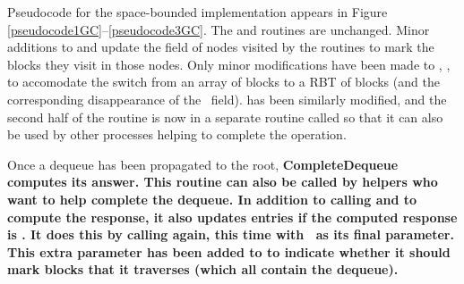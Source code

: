 
Pseudocode for the space-bounded implementation appears in Figure \ref{pseudocode1GC}--\ref{pseudocode3GC}.
The  and  routines are unchanged.
Minor additions to  and  update the  field of nodes
visited by the routines to mark the blocks they visit in those nodes.
Only minor modifications have been made to , , 
to accomodate the switch from an array of blocks to a RBT of blocks (and the corresponding disappearance
of the \head\ field).
 has been similarly modified, and the second half of the routine is now in a
separate routine called  so that it can also be used by other processes
helping to complete the operation.

Once a dequeue has been propagated to the root, 
\bf{\op CompleteDequeue} computes its answer.  This routine can also be called by helpers 
who want to help complete the dequeue.
In addition to calling  and  to compute the response,
it also updates  entries if the computed response is \nl.
It does this by calling  again, this time with \tr\ as its final parameter.
This extra parameter has been added to 
 to indicate whether it should mark blocks that it traverses (which all contain the dequeue).




\renewcommand{\algorithmiccomment}[1]{\hfill\eqparbox{COMMENTDOUBLE}{\com\ #1}}

